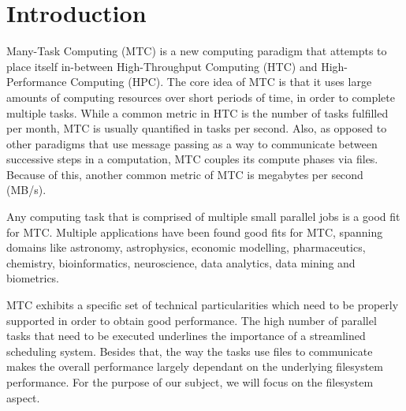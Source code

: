 
\chapter{Introduction} %

\label{Chapter1} %



Many-Task Computing (MTC)\cite{mtc} is a new computing paradigm that attempts to place itself in-between High-Throughput Computing (HTC) and High-Performance Computing (HPC). The core idea of MTC is that it uses large amounts of computing resources over short periods of time, in order to complete multiple tasks. While a common metric in HTC is the number of tasks fulfilled per month, MTC is usually quantified in tasks per second. Also, as opposed to other paradigms that use message passing as a way to communicate between successive steps in a computation, MTC couples its compute phases via files. Because of this, another common metric of MTC is megabytes per second (MB/s).

Any computing task that is comprised of multiple small parallel jobs is a good fit for MTC. Multiple applications have been found good fits for MTC\cite{mtc}, spanning domains like astronomy, astrophysics, economic modelling, pharmaceutics, chemistry, bioinformatics, neuroscience, data analytics, data mining and biometrics.

MTC exhibits a specific set of technical particularities which need to be properly supported in order to obtain good performance. The high number of parallel tasks that need to be executed underlines the importance of a streamlined scheduling system. Besides that, the way the tasks use files to communicate makes the overall performance largely dependant on the underlying filesystem performance. For the purpose of our subject, we will focus on the filesystem aspect.



